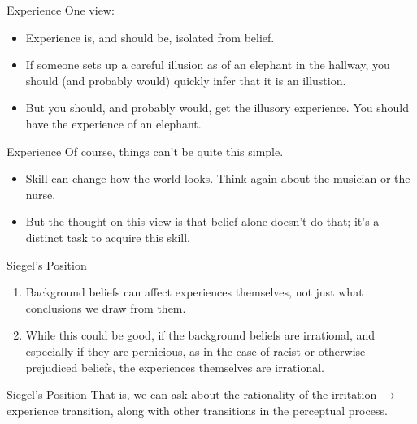 \documentclass[
  17pt,
  letterpaper,
  ignorenonframetext,
  aspectratio=169,
  handout,
  xcolor={dvipsnames}]{beamer}
\providecommand{\tightlist}{%
  \setlength{\itemsep}{0pt}\setlength{\parskip}{0pt}}\usepackage{longtable,booktabs,array}
\begin{document}
\begin{frame}{Experience}
\protect\hypertarget{experience-1}{}
One view:

\begin{itemize}[<+->]
\tightlist
\item
  Experience is, and should be, isolated from belief.
\item
  If someone sets up a careful illusion as of an elephant in the
  hallway, you should (and probably would) quickly infer that it is an
  illustion.
\item
  But you should, and probably would, get the illusory experience. You
  should have the experience of an elephant.
\end{itemize}
\end{frame}

\begin{frame}{Experience}
\protect\hypertarget{experience-2}{}
Of course, things can't be quite this simple.

\begin{itemize}[<+->]
\tightlist
\item
  Skill can change how the world looks. Think again about the musician
  or the nurse.
\item
  But the thought on this view is that belief alone doesn't do that;
  it's a distinct task to acquire this skill.
\end{itemize}
\end{frame}

\begin{frame}{Siegel's Position}
\protect\hypertarget{siegels-position}{}
\begin{enumerate}[<+->]
\tightlist
\item
  Background beliefs can affect experiences themselves, not just what
  conclusions we draw from them.
\item
  While this could be good, if the background beliefs are irrational,
  and especially if they are pernicious, as in the case of racist or
  otherwise prejudiced beliefs, the experiences themselves are
  irrational.
\end{enumerate}
\end{frame}

\begin{frame}{Siegel's Position}
\protect\hypertarget{siegels-position-1}{}
That is, we can ask about the rationality of the irritation
\(\rightarrow\) experience transition, along with other transitions in
the perceptual process.
\end{frame}
\end{document}
